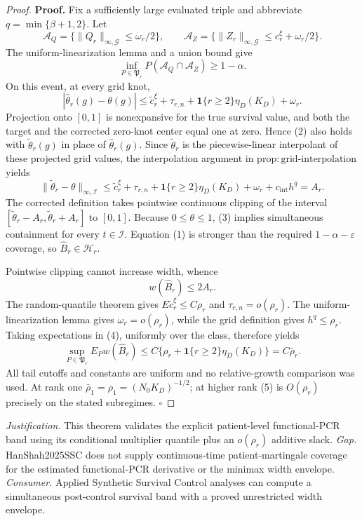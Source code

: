 \documentclass{article}
\begin{document}
\begin{proof}
\textbf{Proof.}
Fix a sufficiently large evaluated triple and abbreviate \(q=\min\{\beta+1,2\}\).  Let
\[
 \mathcal A_Q=\{\|Q_r\|_{\infty,\mathcal G}\le\omega_r/2\},
 \qquad
 \mathcal A_Z=\{\|Z_r\|_{\infty,\mathcal G}\le c_r^\xi+\omega_r/2\}.
\]
The uniform-linearization lemma and a union bound give
\[
 \inf_{P\in\mathfrak P_r}P(\mathcal A_Q\cap\mathcal A_Z)
 \ge1-\alpha.                                           \tag{1}
\]
On this event, at every grid knot,
\[
 |\widehat\theta_r(g)-\theta(g)|
 \le \widetilde c_r^\xi+\tau_{r,n}
 +\mathbf1\{r\ge2\}\eta_D(K_D)+\omega_r.              \tag{2}
\]
Projection onto \([0,1]\) is nonexpansive for the true survival value, and both the target and the corrected zero-knot center equal one at zero.  Hence (2) also holds with \(\widetilde\theta_r(g)\) in place of \(\widehat\theta_r(g)\).  Since \(\widetilde\theta_r\) is the piecewise-linear interpolant of these projected grid values, the interpolation argument in \(\mathrm{prop:grid\mbox{-}interpolation}\) yields
\[
 \|\widetilde\theta_r-\theta\|_{\infty,\mathcal I}
 \le \widetilde c_r^\xi+\tau_{r,n}
 +\mathbf1\{r\ge2\}\eta_D(K_D)+\omega_r
 +c_{\mathrm{int}}h^q=A_r.                              \tag{3}
\]
The corrected definition takes pointwise continuous clipping of the interval \([\widetilde\theta_r-A_r,\widetilde\theta_r+A_r]\) to \([0,1]\).  Because \(0\le\theta\le1\), (3) implies simultaneous containment for every \(t\in\mathcal I\).  Equation (1) is stronger than the required \(1-\alpha-\varepsilon\) coverage, so \(\widehat B_r\in\mathcal H_r\).

Pointwise clipping cannot increase width, whence
\[
 w(\widehat B_r)\le2A_r.                                \tag{4}
\]
The random-quantile theorem gives \(E\widetilde c_r^\xi\le C\rho_r\) and \(\tau_{r,n}=o(\rho_r)\).  The uniform-linearization lemma gives \(\omega_r=o(\rho_r)\), while the grid definition gives \(h^q\le\rho_r\).  Taking expectations in (4), uniformly over the class, therefore yields
\[
 \sup_{P\in\mathfrak P_r}E_Pw(\widehat B_r)
 \le C\{\rho_r+\mathbf1\{r\ge2\}\eta_D(K_D)\}
 =C\bar\rho_r.                                         \tag{5}
\]
All tail cutoffs and constants are uniform and no relative-growth comparison was used.  At rank one \(\bar\rho_1=\rho_1=(N_0K_D)^{-1/2}\); at higher rank (5) is \(O(\rho_r)\) precisely on the stated subregimes. \(\square\)
\end{proof}
\par\smallskip\noindent \textit{Justification.} This theorem validates the explicit patient-level functional-PCR band using its conditional multiplier quantile plus an \(o(\rho_r)\) additive slack. \textit{Gap.} HanShah2025SSC does not supply continuous-time patient-martingale coverage for the estimated functional-PCR derivative or the minimax width envelope. \textit{Consumer.} Applied Synthetic Survival Control analyses can compute a simultaneous post-control survival band with a proved unrestricted width envelope.
\end{document}
